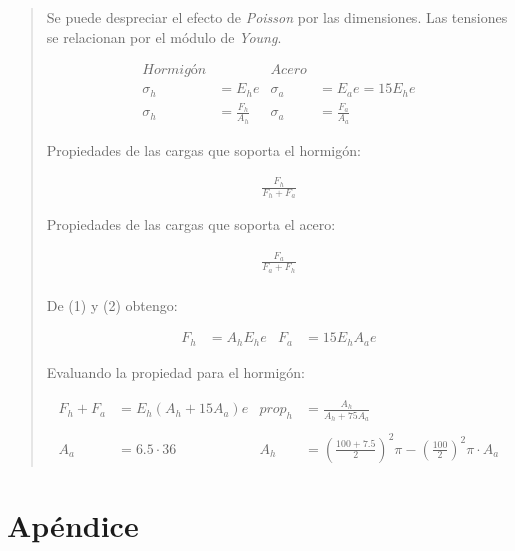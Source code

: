 \documentclass[a4paper,10pt,twoside,final,spanish]{article}
\begin{document}
\begin{quote}
Se puede despreciar el efecto de \textit{Poisson} por las dimensiones. Las tensiones se relacionan por el módulo de \textit{Young}.

\begin{align}
\textit{Hormigón} && \textit{Acero} \nonumber \\
\sigma_{h} &= E_{h}e & \sigma_{a} &= E_{a}e=15E_{h}e \\
\sigma_{h} &= \frac{F_{h}}{A_{h}} & \sigma_{a} &= \frac{F_{a}}{A_{a}}
\end{align}

\begin{minipage}[t]{0.4\linewidth}

Propiedades de las cargas que soporta el hormigón:

\begin{align*}
\frac{F_{h}}{F_{h}+F_{a}}
\end{align*}

\end{minipage} \hfill \begin{minipage}[t]{0.4\linewidth}

Propiedades de las cargas que soporta el acero:

\begin{align*}
\frac{F_{a}}{F_{a}+F_{h}} \\
\end{align*}

\end{minipage}

De (1) y (2) obtengo:

\begin{align*}
F_{h} &= A_{h}E_{h}e & F_{a} &= 15E_{h}A_{a}e
\end{align*}

Evaluando la propiedad para el hormigón:

\begin{align*}
F_{h}+F_{a} &= E_{h}(A_{h}+15A_{a})e & prop_{h} &= \frac{A_{h}}{A_{h}+75A_{a}} \\ \\
A_{a} &= 6.5\cdot 36 & A_{h} &= \left(\frac{100+7.5}{2}\right)^{2}\pi
-\left(\frac{100}{2}\right)^{2}\pi\cdot A_{a}
\end{align*}

\end{quote}

\section*{Apéndice}
\end{document}
